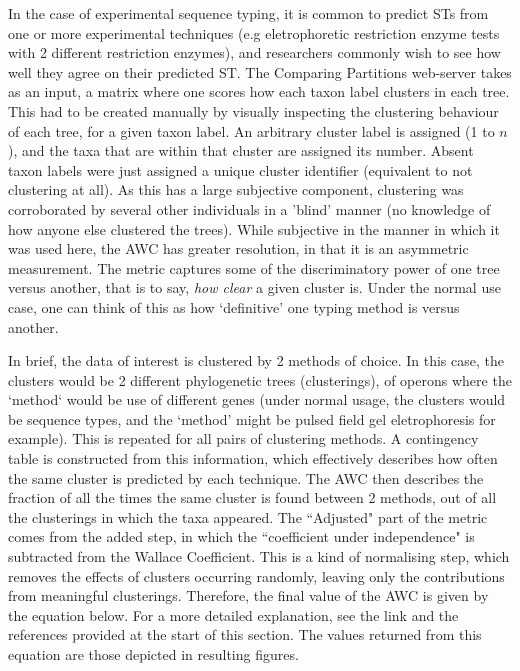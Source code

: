 In the case of experimental sequence typing, it is common to predict STs from one or more experimental techniques (e.g eletrophoretic restriction enzyme tests with 2 different restriction enzymes), and researchers commonly wish to see how well they agree on their predicted ST. The Comparing Partitions web-server takes as an input, a matrix where one scores how each taxon label clusters in each tree. This had to be created manually by visually inspecting the clustering behaviour of each tree, for a given taxon label. An arbitrary cluster label is assigned (1 to $n$), and the taxa that are within that cluster are assigned its number. Absent taxon labels were just assigned a unique cluster identifier (equivalent to not clustering at all). As this has a large subjective component, clustering was corroborated by several other individuals in a 'blind' manner (no knowledge of how anyone else clustered the trees). While subjective in the manner in which it was used here, the AWC has greater resolution, in that it is an asymmetric measurement. The metric captures some of the discriminatory power of one tree versus another, that is to say, \emph{how clear} a given cluster is. Under the normal use case, one can think of this as how `definitive' one typing method is versus another.

In brief, the data of interest is clustered by 2 methods of choice. In this case, the clusters would be 2 different phylogenetic trees (clusterings), of operons where the `method` would be use of different genes (under normal usage, the clusters would be sequence types, and the `method' might be pulsed field gel eletrophoresis for example). This is repeated for all pairs of clustering methods. A contingency table is constructed from this information, which effectively describes how often the same cluster is predicted by each technique. The AWC then describes the fraction of all the times the same cluster is found between 2 methods, out of all the clusterings in which the taxa appeared. The ``Adjusted" part of the metric comes from the added step, in which the ``coefficient under independence" is subtracted from the Wallace Coefficient. This is a kind of normalising step, which removes the effects of clusters occurring randomly, leaving only the contributions from meaningful clusterings. Therefore, the final value of the AWC is given by the equation below. For a more detailed explanation, see the link and the references provided at the start of this section. The values returned from this equation are those depicted in resulting figures.

